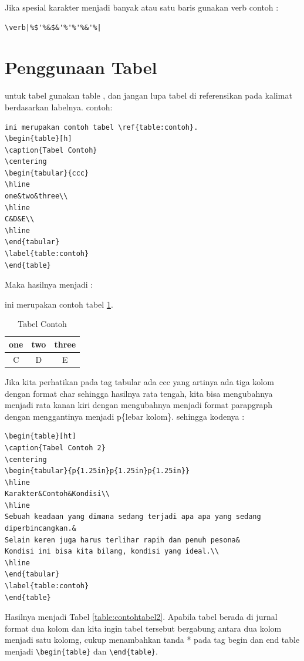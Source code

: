 Jika spesial karakter menjadi banyak atau satu baris gunakan verb
contoh :
\begin{verbatim}
\verb|%$'%&$&'%'%'%&'%|
\end{verbatim}

\section{Penggunaan Tabel}

untuk tabel gunakan table , dan jangan lupa tabel di referensikan pada kalimat berdasarkan labelnya. 
contoh:
\begin{verbatim}
ini merupakan contoh tabel \ref{table:contoh}.
\begin{table}[h]
\caption{Tabel Contoh}
\centering
\begin{tabular}{ccc}
\hline
one&two&three\\
\hline
C&D&E\\
\hline
\end{tabular}
\label{table:contoh}
\end{table}
\end{verbatim}

Maka hasilnya menjadi :

ini merupakan contoh tabel \ref{table:sebuahcontoh1}.
\begin{table}[h]
\caption{Tabel Contoh}
\centering
\begin{tabular}{ccc}
\hline
one&two&three\\
\hline
C&D&E\\
\hline
\end{tabular}
\label{table:sebuahcontoh1}
\end{table}

Jika kita perhatikan pada tag tabular ada ccc yang artinya ada tiga kolom dengan format char sehingga hasilnya rata tengah, kita bisa mengubahnya menjadi rata kanan kiri dengan mengubahnya menjadi format parapgraph dengan menggantinya menjadi p\{lebar kolom\}. sehingga kodenya :
\begin{verbatim}
\begin{table}[ht]
\caption{Tabel Contoh 2}
\centering
\begin{tabular}{p{1.25in}p{1.25in}p{1.25in}}
\hline
Karakter&Contoh&Kondisi\\
\hline
Sebuah keadaan yang dimana sedang terjadi apa apa yang sedang diperbincangkan.&
Selain keren juga harus terlihar rapih dan penuh pesona&
Kondisi ini bisa kita bilang, kondisi yang ideal.\\
\hline
\end{tabular}
\label{table:contoh}
\end{table}
\end{verbatim}
Hasilnya menjadi Tabel \ref{table:contohtabel2}. Apabila tabel berada di jurnal format dua kolom dan kita ingin tabel tersebut bergabung antara dua kolom menjadi satu kolomg, cukup menambahkan tanda * pada tag begin dan end table menjadi \verb|\begin{table}| dan \verb|\end{table}|.

